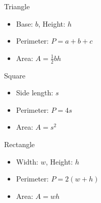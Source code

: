 \documentclass[twocolumn,a4]{article}
\begin{document}
Triangle \\
\begin{minipage}{0.5\linewidth}
    \begin{itemize}
        \item Base: $b$, Height: $h$
        \item Perimeter: $P = a + b + c$
        \item Area: $A = \frac{1}{2} b h$
    \end{itemize}
\end{minipage}
\begin{minipage}{0.4\linewidth}
\end{minipage}

\noindent Square \\
\begin{minipage}{0.4\linewidth}
	\begin{itemize}
	    \item Side length: $s$
	    \item Perimeter: $P = 4s$
	    \item Area: $A = s^2$
	\end{itemize}
\end{minipage}
\begin{minipage}{0.4\linewidth}
\end{minipage}

\noindent Rectangle \\
\begin{minipage}{0.5\linewidth}
	\begin{itemize}
	    \item Width: $w$, Height: $h$
	    \item Perimeter: $P = 2(w + h)$
	    \item Area: $A = wh$
	\end{itemize}
\end{minipage}
\begin{minipage}{0.4\linewidth}
\end{minipage}
\end{document}
